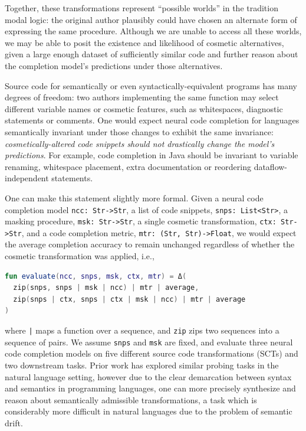 \documentclass[sigconf,review,anonymous]{acmart}
\begin{document}
  Together, these transformations represent ``possible worlds'' in the tradition modal logic: the original author plausibly could have chosen an alternate form of expressing the same procedure. Although we are unable to access all these worlds, we may be able to posit the existence and likelihood of cosmetic alternatives, given a large enough dataset of sufficiently similar code and further reason about the completion model's predictions under those alternatives.

  Source code for semantically or even syntactically-equivalent programs has many degrees of freedom: two authors implementing the same function may select different variable names or cosmetic features, such as whitespaces, diagnostic statements or comments. One would expect neural code completion for languages semantically invariant under those changes to exhibit the same invariance: \textit{cosmetically-altered code snippets should not drastically change the model's predictions}. For example, code completion in Java should be invariant to variable renaming, whitespace placement, extra documentation or reordering dataflow-independent statements.

  One can make this statement slightly more formal. Given a neural code completion model \lstinline|ncc: Str->Str|, a list of code snippets, \lstinline|snps: List<Str>|, a masking procedure, \lstinline|msk: Str->Str|, a single cosmetic transformation, \lstinline|ctx: Str->Str|, and a code completion metric, \lstinline|mtr: (Str, Str)->Float|, we would expect the average completion accuracy to remain unchanged regardless of whether the cosmetic transformation was applied, i.e.,

  \noindent\begin{lstlisting}[basicstyle=\footnotesize\ttfamily, language=kotlin,label={lst:lstlisting}]
fun evaluate(ncc, snps, msk, ctx, mtr) = Δ(
  zip(snps, snps | msk | ncc) | mtr | average,
  zip(snps | ctx, snps | ctx | msk | ncc) | mtr | average
)
  \end{lstlisting}

  \noindent where \texttt{|} maps a function over a sequence, and \lstinline|zip| zips two sequences into a sequence of pairs. We assume \lstinline|snps| and \lstinline|msk| are fixed, and evaluate three neural code completion models on five different source code transformations (SCTs) and two downstream tasks. Prior work has explored similar probing tasks in the natural language setting, however due to the clear demarcation between syntax and semantics in programming languages, one can more precisely synthesize and reason about semantically admissible transformations, a task which is considerably more difficult in natural languages due to the problem of semantic drift.
\end{document}
